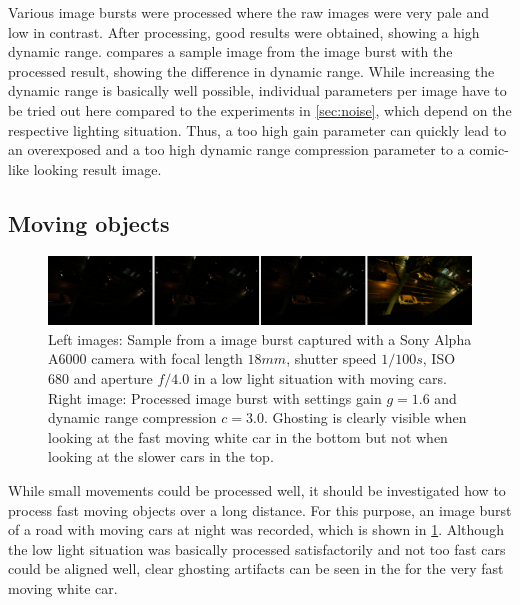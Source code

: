 \documentclass{egpubl}
\begin{document}
Various image bursts were processed where the raw images were very pale 
and low in contrast. After processing, good results were obtained, showing 
a high dynamic range.  compares a sample image from the image burst 
with the processed result, showing the difference in dynamic range. While 
increasing the dynamic range is basically well possible, individual parameters 
per image have to be tried out here compared to the experiments in \cref{sec:noise}, 
which depend on the respective lighting situation. Thus, a too high gain 
parameter can quickly lead to an overexposed and a too high dynamic range 
compression parameter to a comic-like looking result image.

\subsection{Moving objects}
\label{sec:moving}

\begin{figure}
      \hspace{\fill}
      \includegraphics[width=0.9\linewidth]{images/moving_burst.png}
      \hspace{\fill}
      \centering
      \caption{
            Left images: Sample from a image burst captured with a Sony Alpha A6000 camera
            with focal length $18mm$, shutter speed $1/100s$, ISO $680$ 
            and aperture $f/4.0$ in a low light situation with moving cars.
            Right image: Processed image burst with settings gain $g = 1.6$ and dynamic 
            range compression $c = 3.0$. Ghosting is clearly visible when looking at the 
            fast moving white car in the bottom but not when looking at the slower cars
            in the top.
      }
      \label{fig:moving}
\end{figure}

While small movements could be processed well, it should be investigated how to 
process fast moving objects over a long distance. For this purpose, an image burst 
of a road with moving cars at night was recorded, which is shown in \cref{fig:moving}. 
Although the low light situation was basically processed satisfactorily and not 
too fast cars could be aligned well, clear ghosting artifacts can be seen in the 
for the very fast moving white car.
\end{document}
